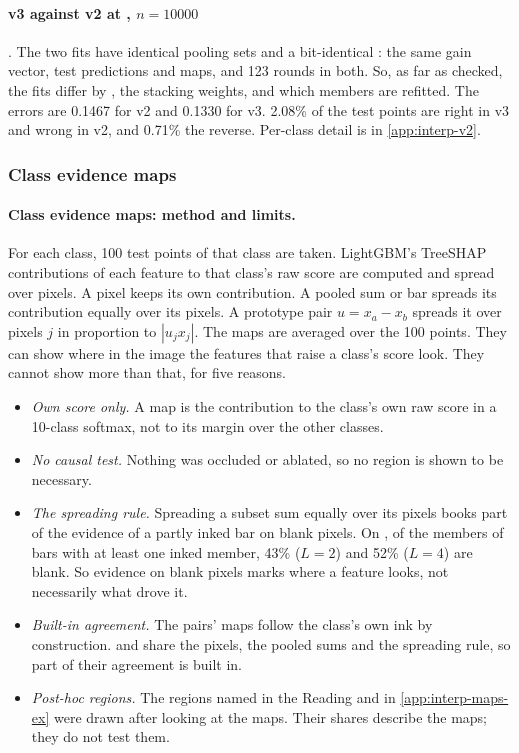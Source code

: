 \paragraph{v3 against v2 at , $n=10000$} . The two fits have identical pooling sets and a bit-identical : the same gain vector, test predictions and maps, and 123 rounds in both. So, as far as checked, the fits differ by , the stacking weights, and which members are refitted. The errors are 0.1467 for v2 and 0.1330 for v3. 2.08\% of the test points are right in v3 and wrong in v2, and 0.71\% the reverse. Per-class detail is in \cref{app:interp-v2}.

\subsubsection{Class evidence maps}\label{sec:interp-img-maps}

\paragraph{Class evidence maps: method and limits.} For each class, 100 test points of that class are taken. LightGBM's TreeSHAP contributions \cite{lundberg2020local} of each feature to that class's raw score are computed and spread over pixels. A pixel keeps its own contribution. A pooled sum or bar spreads its contribution equally over its pixels. A prototype pair $u=x_a-x_b$ spreads it over pixels $j$ in proportion to $|u_jx_j|$. The maps are averaged over the 100 points. They can show where in the image the features that raise a class's score look. They cannot show more than that, for five reasons.
\begin{itemize}
\item \emph{Own score only.} A map is the contribution to the class's own raw score in a 10-class softmax, not to its margin over the other classes.
\item \emph{No causal test.} Nothing was occluded or ablated, so no region is shown to be necessary.
\item \emph{The spreading rule.} Spreading a subset sum equally over its pixels books part of the evidence of a partly inked bar on blank pixels. On , of the members of bars with at least one inked member, 43\% ($L=2$) and 52\% ($L=4$) are blank. So evidence on blank pixels marks where a feature looks, not necessarily what drove it.
\item \emph{Built-in agreement.} The pairs' maps follow the class's own ink by construction.  and  share the pixels, the pooled sums and the spreading rule, so part of their agreement is built in.
\item \emph{Post-hoc regions.} The regions named in the Reading and in \cref{app:interp-maps-ex} were drawn after looking at the maps. Their shares describe the maps; they do not test them.
\end{itemize}


